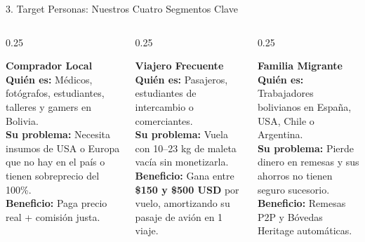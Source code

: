 \documentclass[10pt,aspectratio=169]{beamer}
\begin{document}
\begin{frame}{3. Target Personas: Nuestros Cuatro Segmentos Clave}
  \begin{columns}[T]
    \begin{column}{0.25\textwidth}
      \begin{block}{\centering \textbf{Comprador Local}}
        \scriptsize
        \textbf{Quién es:} Médicos, fotógrafos, estudiantes, talleres y gamers en Bolivia.\\
        \vspace{0.1cm}
        \textbf{Su problema:} Necesita insumos de USA o Europa que no hay en el país o tienen sobreprecio del 100\%.\\
        \vspace{0.1cm}
        \textbf{Beneficio:} Paga precio real + comisión justa.
      \end{block}
    \end{column}
    \begin{column}{0.25\textwidth}
      \begin{block}{\centering \textbf{Viajero Frecuente}}
        \scriptsize
        \textbf{Quién es:} Pasajeros, estudiantes de intercambio o comerciantes.\\
        \vspace{0.1cm}
        \textbf{Su problema:} Vuela con 10--23 kg de maleta vacía sin monetizarla.\\
        \vspace{0.1cm}
        \textbf{Beneficio:} Gana entre \textbf{\$150 y \$500 USD} por vuelo, amortizando su pasaje de avión en 1 viaje.
      \end{block}
    \end{column}
    \begin{column}{0.25\textwidth}
      \begin{block}{\centering \textbf{Familia Migrante}}
        \scriptsize
        \textbf{Quién es:} Trabajadores bolivianos en España, USA, Chile o Argentina.\\
        \vspace{0.1cm}
        \textbf{Su problema:} Pierde dinero en remesas y sus ahorros no tienen seguro sucesorio.\\
        \vspace{0.1cm}
        \textbf{Beneficio:} Remesas P2P y Bóvedas Heritage automáticas.

\end{block}
\end{column}
\end{columns}
\end{frame}
\end{document}
